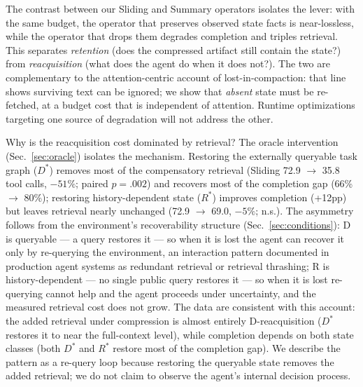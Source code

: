 \documentclass[11pt]{article}
\begin{document}
The contrast between our Sliding and Summary operators isolates the lever: with the same
budget, the operator that preserves observed state facts is near-lossless, while the
operator that drops them degrades completion and triples retrieval. This separates
\emph{retention} (does the compressed artifact still contain the state?) from \emph{reacquisition}
(what does the agent do when it does not?). The two are complementary to the
attention-centric account of lost-in-compaction: that line shows surviving text can be
ignored; we show that \emph{absent} state must be re-fetched, at a budget cost that is
independent of attention. Runtime optimizations targeting one source of degradation will
not address the other.

Why is the reacquisition cost dominated by retrieval? The oracle intervention
(Sec.~\ref{sec:oracle}) isolates the mechanism. Restoring the externally queryable task graph ($D^*$) removes most
of the compensatory retrieval (Sliding 72.9 $\to$ 35.8 tool calls, $-51\%$; paired $p = .002$) and
recovers most of the completion gap (66\% $\to$ 80\%); restoring history-dependent state ($R^*$)
improves completion (+12pp) but leaves retrieval nearly unchanged (72.9 $\to$ 69.0, $-5\%$;
n.s.). The asymmetry follows from the environment's recoverability structure
(Sec.~\ref{sec:conditions}): D is queryable --- a query restores it --- so when it is lost the agent can recover it only by
re-querying the environment, an interaction pattern documented in production agent
systems as redundant retrieval or retrieval thrashing; R is history-dependent --- no single
public query restores it --- so when it is lost re-querying cannot help and the agent
proceeds under uncertainty, and the measured retrieval cost does not grow. The data are
consistent with this account: the added retrieval under compression is almost entirely
D-reacquisition ($D^*$ restores it to near the full-context level), while completion depends
on both state classes (both $D^*$ and $R^*$ restore most of the completion gap). We describe
the pattern as a re-query loop because restoring the queryable state removes the added
retrieval; we do not claim to observe the agent's internal decision process.
\end{document}
